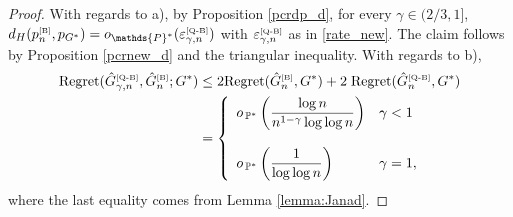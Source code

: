 \documentclass[twoside,12pt]{article}
\newcommand{\PP}{\mathds{P}}
\begin{document}
\begin{proof} 
With regards to a), by Proposition \ref{pcrdp_d}, for every $\gamma\in (2/3,1]$, $d_H(p_n^{\text{\tiny{[B]}}},p_{G^\ast})=o_{\PP^\ast}(\varepsilon_{\gamma,n}^{\text{\tiny{[Q-B]}}})$  with $\varepsilon_{\gamma,n}^{\text{\tiny{[Q-B]}}}$ as in \eqref{rate_new}. The claim follows by Proposition \ref{pcrnew_d} and the triangular inequality. With regards to b),
 \begin{align*}
     \text{Regret}(\hat G_{\gamma,n}^{\text{\tiny{[Q-B]}}},\hat G_{n}^{\text{\tiny{[B]}}};G^{\ast})
      &\leq 2\text{Regret}(\hat G_{n}^{\text{\tiny{[B]}}},G^\ast)+2\;\text{Regret}(\hat G_{n}^{\text{\tiny{[Q-B]}}},G^\ast)\\
  &=
      \left\{
\begin{array}{ll}
o_{\,\mathbb{P}^{\ast}}\left(\dfrac{\log n}{n^{1-\gamma}\log\log n}\right)&\gamma <1\\
\\
o_{\,\mathbb{P}^{\ast}}\left(\dfrac{1}{\log\log n}\right)&\gamma =1,
\end{array}
\right.
\end{align*}
where the last equality comes from Lemma \ref{lemma:Janad}.
\end{proof}

\end{document}
